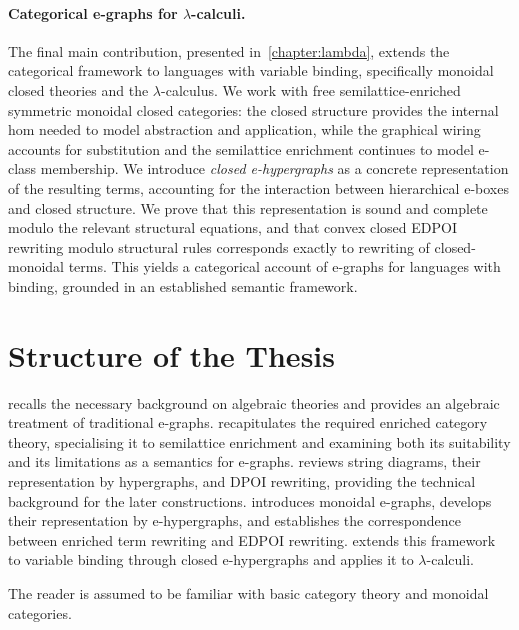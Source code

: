 \paragraph{Categorical e-graphs for $\lambda$-calculi.}
The final main contribution, presented in~\cref{chapter:lambda}, extends the categorical framework to languages with variable binding, specifically monoidal closed theories and the $\lambda$-calculus.
We work with free semilattice-enriched symmetric monoidal closed categories: the closed structure provides the internal hom needed to model abstraction and application, while the graphical wiring accounts for substitution and the semilattice enrichment continues to model e-class membership.
We introduce \emph{closed e-hypergraphs} as a concrete representation of the resulting terms, accounting for the interaction between hierarchical e-boxes and closed structure.
We prove that this representation is sound and complete modulo the relevant structural equations, and that convex closed EDPOI rewriting modulo structural rules corresponds exactly to rewriting of closed-monoidal terms.
This yields a categorical account of e-graphs for languages with binding, grounded in an established semantic framework.

\section*{Structure of the Thesis}

 recalls the necessary background on algebraic theories and provides an algebraic treatment of traditional e-graphs.
 recapitulates the required enriched category theory, specialising it to semilattice enrichment and examining both its suitability and its limitations as a semantics for e-graphs.
 reviews string diagrams, their representation by hypergraphs, and DPOI rewriting, providing the technical background for the later constructions.
 introduces monoidal e-graphs, develops their representation by e-hypergraphs, and establishes the correspondence between enriched term rewriting and EDPOI rewriting.
 extends this framework to variable binding through closed e-hypergraphs and applies it to $\lambda$-calculi.

The reader is assumed to be familiar with basic category theory and monoidal categories.